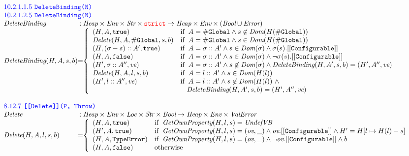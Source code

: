 \documentclass[a4paper, leqno]{amsart}
\def\inred{\color{red}}
\def\inblue{\color{blue}}
\newcommand{\strict}{{\inred\tt strict}}
\newcommand{\UndefVB}{\emph{UndefVB}}
\newcommand{\false}{{\tt false}}
\newcommand{\true}{{\tt true}}
\newcommand{\er}{\ensuremath{\sigma}}
\newcommand{\Bool}{\emph{Bool}}
\newcommand{\ValError}{\emph{ValError}}
\newcommand{\Error}{\emph{Error}}
\newcommand{\te}{{\tt TypeError}}
\newcommand{\Loc}{\emph{Loc}}
\newcommand{\Str}{\emph{Str}}
\newcommand{\Heap}{\emph{Heap}}
\newcommand{\Env}{\emph{Env}}
\renewcommand{\lg}{{\tt \#Global}}
\newcommand{\hf}[1]{\emph{#1}}
\newcommand{\varloc}[1]{{\tt \##1}}
\newcommand{\ifc}[1]{{\rm if}\begin{array}[t]{l}#1\end{array}}
\def\inred{\color{red}}
\def\inblue{\color{blue}}
\begin{document}
\[\begin{array}{l@{}c@{}l}
\multicolumn{3}{l}{\mbox{\inblue 10.2.1.1.5 {\tt DeleteBinding(N)}}}\\
\multicolumn{3}{l}{\mbox{\inblue 10.2.1.2.5 {\tt DeleteBinding(N)}}}\\
\hf{DeleteBinding} & :& \Heap \times \Env \times \Str \times \strict \rightarrow
\Heap \times \Env \times (\Bool\cup\Error) \\
\hf{DeleteBinding}(H,A,s,b) &=&
\left\{\begin{array}{ll}
(H,A,\true) &\ifc{A = \lg \wedge
 s\not\in\hf{Dom}(H(\varloc{Global}))}\\
\hf{Delete}(H,A,\lg,s,b) &\ifc{A = \lg \wedge
 s\in\hf{Dom}(H(\varloc{Global}))}\\
(H, (\er - s)::A', \true) &\ifc{A = \er::A'\wedge s\in\hf{Dom}(\er) \wedge \er(s).[[{\tt Configurable}]]} \\
(H, A, \false) &\ifc{A = \er::A'\wedge s\in\hf{Dom}(\er) \wedge \neg\er(s).[[{\tt Configurable}]]} \\
(H',\er::A'',\emph{ve})
&\ifc{A = \er::A'\wedge s\not\in\hf{Dom}(\er) \wedge \hf{DeleteBinding}(H, A', s, b) = (H',A'',\emph{ve})}\\
\hf{Delete}(H,A,l,s,b)
&\ifc{A = l::A' \wedge s\in\hf{Dom}(H(l))} \\
(H',l::A'',\emph{ve})
&\ifc{A = l::A' \wedge s\not\in\hf{Dom}(H(l))\ \wedge}\\
&\mbox{\phantom{if\ }$\hf{DeleteBinding}(H, A', s, b) = (H',A'',\emph{ve})$} \\
\end{array}\right.
\\\\

\multicolumn{3}{l}{\mbox{\inblue 8.12.7 {\tt [[Delete]](P, Throw)}}}\\
\hf{Delete}&:&\Heap \times \Env \times \Loc \times \Str \times \Bool \rightarrow
\Heap \times \Env \times \ValError\\
\hf{Delete}(H,A,l,s,b) &=&
\left\{\begin{array}{ll}
(H, A, \true) & \ifc{\hf{GetOwnProperty}(H, l, s) = \UndefVB}\\
(H', A, \true) & \ifc{\hf{GetOwnProperty}(H, l, s) = (\emph{ov}, \_) \wedge
\emph{ov}.{\tt[[Configurable]]} \wedge
H' = H[l\mapsto H(l)-s]}\\
(H, A, \te)&\ifc{\hf{GetOwnProperty}(H, l, s) = (\emph{ov}, \_) \wedge
\neg\emph{ov}.{\tt[[Configurable]]} \wedge b}\\
(H, A, \false)& \mbox{otherwise}
\end{array}\right.
\\[2em]


\end{array}\]
\end{document}
